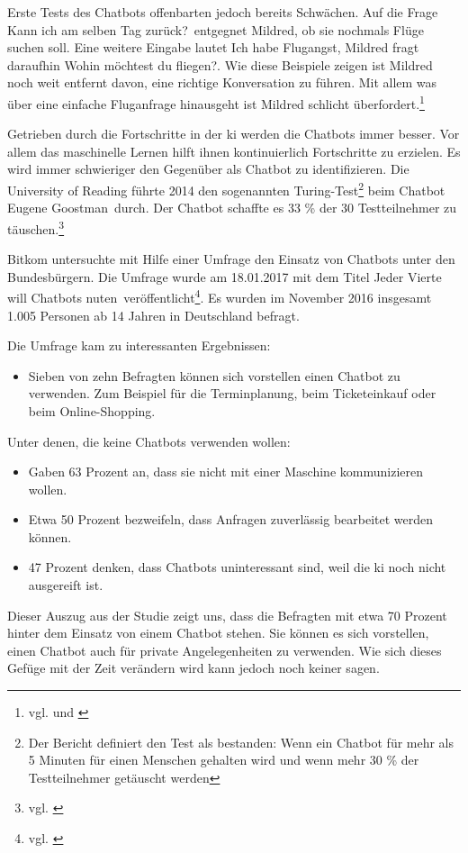 Erste Tests des Chatbots offenbarten jedoch bereits Schwächen. Auf die Frage \glqq Kann ich am selben Tag zurück?\grqq\ entgegnet Mildred, ob sie nochmals Flüge suchen soll. Eine weitere Eingabe lautet \glqq Ich habe Flugangst\grqq, Mildred fragt daraufhin \glqq Wohin möchtest du fliegen?\grqq. Wie diese Beispiele zeigen ist Mildred noch weit entfernt davon, eine richtige Konversation zu führen. Mit allem was über eine einfache Fluganfrage hinausgeht ist Mildred schlicht überfordert.\footnote{vgl. \cite{LHQuelle1} und \cite{LHQuelle2}} 

Getrieben durch die Fortschritte in der \ac{ki} werden die Chatbots immer besser. Vor allem das maschinelle Lernen hilft ihnen kontinuierlich Fortschritte zu erzielen. Es wird immer schwieriger den Gegenüber als Chatbot zu identifizieren. Die University of Reading führte 2014 den sogenannten Turing-Test\footnote{Der Bericht definiert den Test als bestanden: Wenn ein Chatbot für mehr als 5 Minuten für einen Menschen gehalten wird und wenn mehr 30 \% der Testteilnehmer getäuscht werden} beim Chatbot \glqq Eugene Goostman\grqq\ durch. Der Chatbot schaffte es 33 \% der 30 Testteilnehmer zu täuschen.\footnote{vgl. \cite{UnivOfReading}}

Bitkom untersuchte mit Hilfe einer Umfrage den Einsatz von Chatbots unter den Bundesbürgern. Die Umfrage wurde am 18.01.2017 mit dem Titel \glqq Jeder Vierte will Chatbots nuten\grqq\ veröffentlicht\footnote{vgl. \cite{BitkomChatbot}}. Es wurden im November 2016 insgesamt 1.005 Personen ab 14 Jahren in Deutschland befragt. 

Die Umfrage kam zu interessanten Ergebnissen:
\begin{itemize}
	\item Sieben von zehn Befragten können sich vorstellen einen Chatbot zu verwenden. Zum Beispiel für die Terminplanung, 	beim Ticketeinkauf oder beim Online-Shopping.
\end{itemize}
Unter denen, die keine Chatbots verwenden wollen:
\begin{itemize}	
	\item Gaben 63 Prozent an, dass sie nicht mit einer Maschine kommunizieren wollen. 
	\item Etwa 50 Prozent bezweifeln, dass Anfragen zuverlässig bearbeitet werden können.
	\item 47 Prozent denken, dass Chatbots uninteressant sind, weil die \ac{ki} noch nicht ausgereift ist.
\end{itemize}
Dieser Auszug aus der Studie zeigt uns, dass die Befragten mit etwa 70 Prozent hinter dem Einsatz von einem Chatbot stehen. Sie können es sich vorstellen, einen Chatbot auch für private Angelegenheiten zu verwenden. Wie sich dieses Gefüge mit der Zeit verändern wird kann jedoch noch keiner sagen.  

